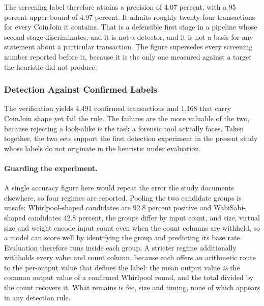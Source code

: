 \documentclass[12pt,a4paper]{article}
\begin{document}
The screening label therefore attains a precision of 4.07
percent, with a 95 percent upper bound of 4.97 percent. It admits
roughly twenty-four transactions for every CoinJoin it contains.
That is a defensible first stage in a pipeline whose second stage
discriminates, and it is not a detector, and it is not a basis
for any statement about a particular transaction. The figure
supersedes every screening number reported before it, because it
is the only one measured against a target the heuristic did not
produce.

\subsubsection{Detection Against Confirmed Labels}
\label{sec:confirmed_detection}

The verification yields 4{,}491 confirmed transactions and
1{,}168 that carry CoinJoin shape yet fail the rule. The failures
are the more valuable of the two, because rejecting a look-alike
is the task a forensic tool actually faces. Taken together, the
two sets support the first detection experiment in the present
study whose labels do not originate in the heuristic under
evaluation.

\paragraph{Guarding the experiment.}
A single accuracy figure here would repeat the error the study
documents elsewhere, so four regimes are reported. Pooling the
two candidate groups is unsafe: Whirlpool-shaped candidates are
92.8 percent positive and WabiSabi-shaped candidates 42.8
percent, the groups differ by input count, and size, virtual size
and weight encode input count even when the count columns are
withheld, so a model can score well by identifying the group and
predicting its base rate. Evaluation therefore runs inside each
group. A stricter regime additionally withholds every value and
count column, because each offers an arithmetic route to the
per-output value that defines the label: the mean output value
\emph{is} the common output value of a confirmed Whirlpool round,
and the total divided by the count recovers it. What remains is
fee, size and timing, none of which appears in any detection
rule.
\end{document}

